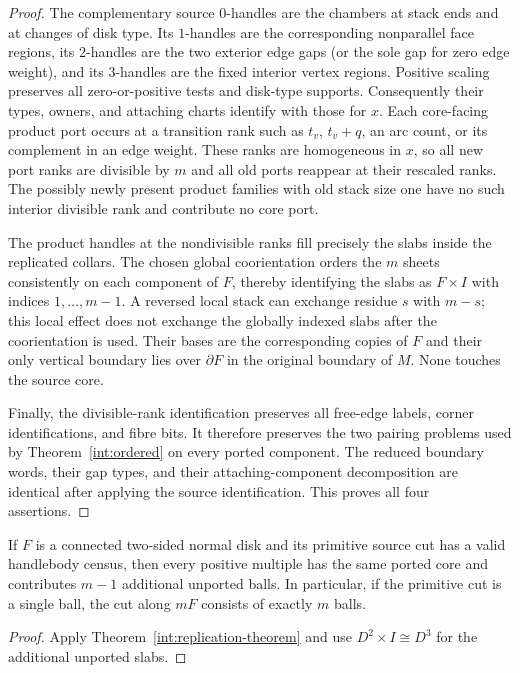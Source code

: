 \begin{proof}
The complementary source $0$-handles are the chambers at stack ends
and at changes of disk type.  Its $1$-handles are the corresponding
nonparallel face regions, its $2$-handles are the two exterior edge
gaps (or the sole gap for zero edge weight), and its $3$-handles are
the fixed interior vertex regions.  Positive scaling preserves all
zero-or-positive tests and disk-type supports.  Consequently their
types, owners, and attaching charts identify with those for $x$.
Each core-facing product port occurs at a transition rank such as
$t_v$, $t_v+q$, an arc count, or its complement in an edge weight.
These ranks are homogeneous in $x$, so all new port ranks are
divisible by $m$ and all old ports reappear at their rescaled ranks.
The possibly newly present product families with old stack size one
have no such interior divisible rank and contribute no core port.

The product handles at the nondivisible ranks fill precisely the
slabs inside the replicated collars.  The chosen global coorientation
orders the $m$ sheets consistently on each component of $F$, thereby
identifying the slabs as $F\times I$ with indices
$1,\ldots,m-1$.  A reversed local stack can exchange residue $s$
with $m-s$; this local effect does not exchange the globally indexed
slabs after the coorientation is used.  Their bases are the corresponding
copies of $F$ and their only vertical boundary lies over $\partial F$
in the original boundary of $M$.  None touches the source core.

Finally, the divisible-rank identification preserves all free-edge
labels, corner identifications, and fibre bits.  It therefore preserves
the two pairing problems used by Theorem~\ref{int:ordered} on every
ported component.  The reduced boundary words, their gap types, and
their attaching-component decomposition are identical after applying
the source identification.  This proves all four assertions.
\end{proof}

\begin{corollary}
\label{int:replicated-disk}
If $F$ is a connected two-sided normal disk and its primitive source cut
has a valid handlebody census, then every positive multiple has the same
ported core and contributes $m-1$ additional unported balls.  In particular,
if the primitive cut is a single ball, the cut along $mF$ consists of
exactly $m$ balls.
\end{corollary}

\begin{proof}
Apply Theorem~\ref{int:replication-theorem} and use
$D^2\times I\cong D^3$ for the additional unported slabs.
\end{proof}

